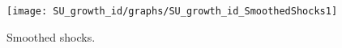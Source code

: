  
\begin{figure}[H]
\centering 
\texttt{[image: SU\_growth\_id/graphs/SU\_growth\_id\_SmoothedShocks1]}
\caption{Smoothed shocks.}\label{Fig:SmoothedShocks:1}
\end{figure}


